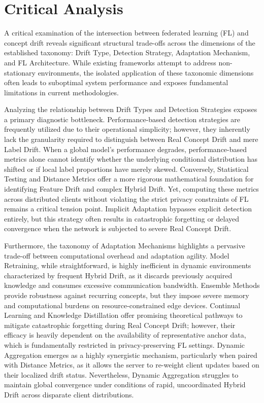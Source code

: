 \documentclass[journal]{IEEEtran}
\begin{document}
\section{Critical Analysis}
\label{sec:critical_analysis}

A critical examination of the intersection between federated learning (FL) and concept drift reveals significant structural trade-offs across the dimensions of the established taxonomy: Drift Type, Detection Strategy, Adaptation Mechanism, and FL Architecture. While existing frameworks attempt to address non-stationary environments, the isolated application of these taxonomic dimensions often leads to suboptimal system performance and exposes fundamental limitations in current methodologies.

Analyzing the relationship between Drift Types and Detection Strategies exposes a primary diagnostic bottleneck. Performance-based detection strategies are frequently utilized due to their operational simplicity; however, they inherently lack the granularity required to distinguish between Real Concept Drift and mere Label Drift. When a global model's performance degrades, performance-based metrics alone cannot identify whether the underlying conditional distribution has shifted or if local label proportions have merely skewed. Conversely, Statistical Testing and Distance Metrics offer a more rigorous mathematical foundation for identifying Feature Drift and complex Hybrid Drift. Yet, computing these metrics across distributed clients without violating the strict privacy constraints of FL remains a critical tension point. Implicit Adaptation bypasses explicit detection entirely, but this strategy often results in catastrophic forgetting or delayed convergence when the network is subjected to severe Real Concept Drift.

Furthermore, the taxonomy of Adaptation Mechanisms highlights a pervasive trade-off between computational overhead and adaptation agility. Model Retraining, while straightforward, is highly inefficient in dynamic environments characterized by frequent Hybrid Drift, as it discards previously acquired knowledge and consumes excessive communication bandwidth. Ensemble Methods provide robustness against recurring concepts, but they impose severe memory and computational burdens on resource-constrained edge devices. Continual Learning and Knowledge Distillation offer promising theoretical pathways to mitigate catastrophic forgetting during Real Concept Drift; however, their efficacy is heavily dependent on the availability of representative anchor data, which is fundamentally restricted in privacy-preserving FL settings. Dynamic Aggregation emerges as a highly synergistic mechanism, particularly when paired with Distance Metrics, as it allows the server to re-weight client updates based on their localized drift status. Nevertheless, Dynamic Aggregation struggles to maintain global convergence under conditions of rapid, uncoordinated Hybrid Drift across disparate client distributions.
\end{document}
